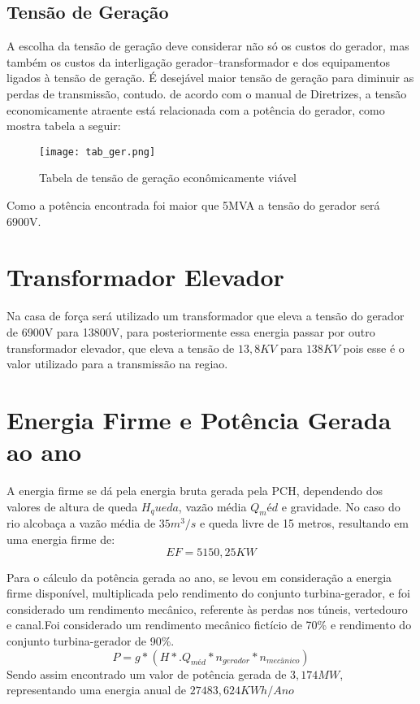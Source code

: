 \subsection{Tensão de Geração}
A escolha da tensão de geração deve considerar não só os custos do gerador, mas também os custos da interligação gerador–transformador e dos equipamentos ligados à tensão de geração. É desejável maior tensão de geração para diminuir as perdas de transmissão, contudo. de acordo com o manual de Diretrizes, a tensão economicamente atraente está relacionada com a potência do gerador, como mostra tabela a seguir:
\begin{figure}[h]
	\centering
	\texttt{[image: tab\_ger.png]}
	\caption{Tabela de tensão de geração econômicamente viável}
	\label{fig:tab_ger}
\end{figure}
Como a potência encontrada foi maior que 5MVA a tensão do gerador será 6900V.

\section{Transformador Elevador}
Na casa de força será utilizado um transformador que eleva a tensão do gerador de 6900V para 13800V, para posteriormente essa energia passar por outro transformador elevador, que eleva a tensão de $13,8KV$ para $138KV$ pois esse é o valor utilizado para a transmissão na regiao.

\section{Energia Firme e Potência Gerada ao ano}
A energia firme se dá pela energia bruta gerada pela PCH, dependendo dos valores de altura de queda $H_queda$, vazão média $Q_méd$ e gravidade. No caso do rio alcobaça a vazão média de $35 m^3/s$ e queda livre de 15 metros, resultando em uma energia firme de:
\begin{equation}
	EF = 5150,25 KW
\end{equation}

Para o cálculo da potência gerada ao ano, se levou em consideração a energia firme disponível, multiplicada pelo rendimento do conjunto turbina-gerador, e foi considerado um rendimento mecânico, referente às perdas nos túneis, vertedouro e canal.Foi considerado um rendimento mecânico fictício de 70\% e rendimento do conjunto turbina-gerador de 90\%.
\begin{equation}
P = g *(H*. Q_{méd} * n_{gerador} *n_{mecânico})
\end{equation}
Sendo assim encontrado um valor de potência gerada de $3,174MW$, representando uma energia anual de $27483,624 KWh/Ano$
